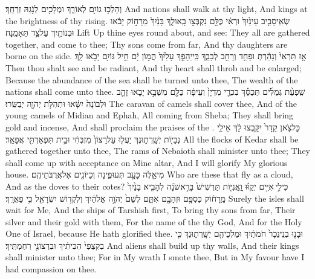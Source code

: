 {וְהָלְכ֥וּ גוֹיִ֖ם לְאוֹרֵ֑ךְ וּמְלָכִ֖ים לְנֹ֥גַהּ זַרְחֵֽךְ׃}
{And nations shall walk at thy light, And kings at the brightness of thy rising.}
{שְׂאִֽי\maqqaf סָבִ֤יב עֵינַ֙יִךְ֙ וּרְאִ֔י כֻּלָּ֖ם נִקְבְּצ֣וּ בָֽאוּ\maqqaf לָ֑ךְ בָּנַ֙יִךְ֙ מֵרָח֣וֹק יָבֹ֔אוּ וּבְנוֹתַ֖יִךְ עַל\maqqaf צַ֥ד תֵּאָמַֽנָה׃}
{Lift Up thine eyes round about, and see: They all are gathered together, and come to thee; Thy sons come from far, And thy daughters are borne on the side.}
{אָ֤ז תִּרְאִי֙ וְנָהַ֔רְתְּ וּפָחַ֥ד וְרָחַ֖ב לְבָבֵ֑ךְ כִּֽי\maqqaf יֵהָפֵ֤ךְ עָלַ֙יִךְ֙ הֲמ֣וֹן יָ֔ם חֵ֥יל גּוֹיִ֖ם יָבֹ֥אוּ לָֽךְ׃}
{Then thou shalt see and be radiant, And thy heart shall throb and be enlarged; Because the abundance of the sea shall be turned unto thee, The wealth of the nations shall come unto thee.}
{שִֽׁפְעַ֨ת גְּמַלִּ֜ים תְּכַסֵּ֗ךְ בִּכְרֵ֤י מִדְיָן֙ וְעֵיפָ֔ה כֻּלָּ֖ם מִשְּׁבָ֣א יָבֹ֑אוּ זָהָ֤ב וּלְבוֹנָה֙ יִשָּׂ֔אוּ וּתְהִלֹּ֥ת יְהֹוָ֖ה יְבַשֵּֽׂרוּ׃}
{The caravan of camels shall cover thee, And of the young camels of Midian and Ephah, All coming from Sheba; They shall bring gold and incense, And shall proclaim the praises of the \lord.}
{כׇּל\maqqaf צֹ֤אן קֵדָר֙ יִקָּ֣בְצוּ לָ֔ךְ אֵילֵ֥י נְבָי֖וֹת יְשָֽׁרְת֑וּנֶךְ יַעֲל֤וּ עַל\maqqaf רָצוֹן֙ מִזְבְּחִ֔י וּבֵ֥ית תִּפְאַרְתִּ֖י אֲפָאֵֽר׃}
{All the flocks of Kedar shall be gathered together unto thee, The rams of Nebaioth shall minister unto thee; They shall come up with acceptance on Mine altar, And I will glorify My glorious house.}
{מִי\maqqaf אֵ֖לֶּה כָּעָ֣ב תְּעוּפֶ֑ינָה וְכַיּוֹנִ֖ים אֶל\maqqaf אֲרֻבֹּתֵיהֶֽם׃}
{Who are these that fly as a cloud, And as the doves to their cotes?}
{כִּי\maqqaf לִ֣י \legarmeh  אִיִּ֣ים יְקַוּ֗וּ וׇֽאֳנִיּ֤וֹת תַּרְשִׁישׁ֙ בָּרִ֣אשֹׁנָ֔ה לְהָבִ֤יא בָנַ֙יִךְ֙ מֵֽרָח֔וֹק כַּסְפָּ֥ם וּזְהָבָ֖ם אִתָּ֑ם לְשֵׁם֙ יְהֹוָ֣ה אֱלֹהַ֔יִךְ וְלִקְד֥וֹשׁ יִשְׂרָאֵ֖ל כִּ֥י פֵאֲרָֽךְ׃}
{Surely the isles shall wait for Me, And the ships of Tarshish first, To bring thy sons from far, Their silver and their gold with them, For the name of the \lord\space thy God, And for the Holy One of Israel, because He hath glorified thee.}
{וּבָנ֤וּ בְנֵֽי\maqqaf נֵכָר֙ חֹמֹתַ֔יִךְ וּמַלְכֵיהֶ֖ם יְשָֽׁרְת֑וּנֶךְ כִּ֤י בְקִצְפִּי֙ הִכִּיתִ֔יךְ וּבִרְצוֹנִ֖י רִחַמְתִּֽיךְ׃}
{And aliens shall build up thy walls, And their kings shall minister unto thee; For in My wrath I smote thee, But in My favour have I had compassion on thee.}
